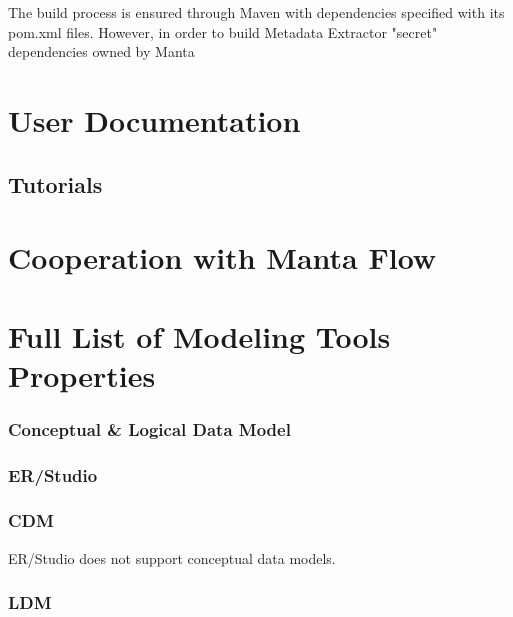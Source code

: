 \documentclass[12pt,a4paper]{report}
\begin{document}
The build process is ensured through Maven with dependencies specified with its pom.xml files.
However, in order to build Metadata Extractor "secret" dependencies owned by Manta 

\section{User Documentation}

\subsection{Tutorials}

\section{Cooperation with Manta Flow}

\section{Full List of Modeling Tools Properties}

\subsubsection{Conceptual \& Logical Data Model}

\subsubsection{ER/Studio}

\subsubsection{CDM}

ER/Studio does not support conceptual data models.

\subsubsection{LDM}
\end{document}
